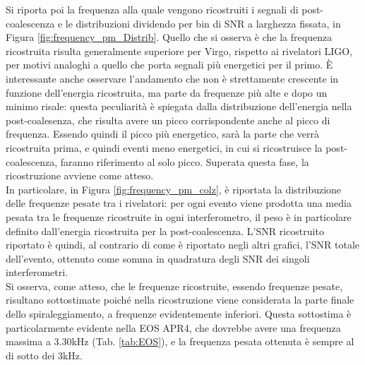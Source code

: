 Si riporta poi la frequenza alla quale vengono ricostruiti i segnali di post-coalescenza e le distribuzioni dividendo per bin di SNR a larghezza fissata, in Figura \ref{fig:frequency_pm_Distrib}. Quello che si osserva è che la frequenza ricostruita risulta generalmente superiore per Virgo, rispetto ai rivelatori LIGO, per motivi analoghi a quello che porta segnali più energetici per il primo. È interessante anche osservare l'andamento che non è strettamente crescente in funzione dell'energia ricostruita, ma parte da frequenze più alte e dopo un minimo risale: questa peculiarità è spiegata dalla distribuzione dell'energia nella post-coalesenza, che risulta avere un picco corrispondente anche al picco di frequenza. Essendo quindi il picco più energetico, sarà la parte che verrà ricostruita prima, e quindi eventi meno energetici, in cui si ricostruisce la post-coalescenza, faranno riferimento al solo picco. Superata questa fase, la ricostruzione avviene come atteso.\\
In particolare, in Figura \ref{fig:frequency_pm_colz}, è riportata la distribuzione delle frequenze pesate tra i rivelatori: per ogni evento viene prodotta una media pesata tra le frequenze ricostruite in ogni interferometro, il peso è in particolare definito dall'energia ricostruita per la post-coalescenza. L'SNR ricostruito riportato è quindi, al contrario di come è riportato negli altri grafici, l'SNR totale dell'evento, ottenuto come somma in quadratura degli SNR dei singoli interferometri.\\
Si osserva, come atteso, che le frequenze ricostruite, essendo frequenze pesate, risultano sottostimate poiché nella ricostruzione viene considerata la parte finale dello spiraleggiamento, a frequenze evidentemente inferiori. Questa sottostima è particolarmente evidente nella EOS APR4, che dovrebbe avere una frequenza massima a 3.30kHz (Tab. \ref{tab:EOS}), e la frequenza pesata ottenuta è sempre al di sotto dei 3kHz.
